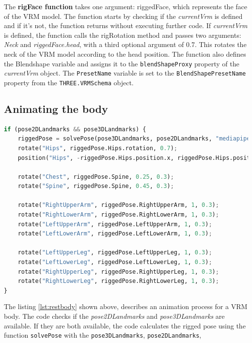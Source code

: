 The \textbf{rigFace function} takes one argument: riggedFace, which represents the face of the VRM model. The function starts 
by checking if the \emph{currentVrm} is defined and if it's not, the function returns without executing further code.
If \emph{currentVrm} is defined, the function calls the rigRotation method and passes two arguments: \emph{Neck} and \emph{riggedFace.head}, 
with a third optional argument of 0.7. This rotates the neck of the VRM model according to the head position.
The function also defines the Blendshape variable and assigns it to the \texttt{blendShapeProxy} property of the \emph{currentVrm} object. 
The \texttt{PresetName} variable is set to the \texttt{BlendShapePresetName} property from the \texttt{THREE.VRMSchema} object.

\subsection{Animating the body}
\begin{lstlisting}[language=Python,caption=Animating the rest of the body,label=lst:restbody]
    if (pose2DLandmarks && pose3DLandmarks) {
    riggedPose = solvePose(pose3DLandmarks, pose2DLandmarks, "mediapipe", videoElement);
    rotate("Hips", riggedPose.Hips.rotation, 0.7);
    position("Hips", -riggedPose.Hips.position.x, riggedPose.Hips.position.y + 1, -riggedPose.Hips.position.z, 1, 0.07);

    rotate("Chest", riggedPose.Spine, 0.25, 0.3);
    rotate("Spine", riggedPose.Spine, 0.45, 0.3);

    rotate("RightUpperArm", riggedPose.RightUpperArm, 1, 0.3);
    rotate("RightLowerArm", riggedPose.RightLowerArm, 1, 0.3);
    rotate("LeftUpperArm", riggedPose.LeftUpperArm, 1, 0.3);
    rotate("LeftLowerArm", riggedPose.LeftLowerArm, 1, 0.3);

    rotate("LeftUpperLeg", riggedPose.LeftUpperLeg, 1, 0.3);
    rotate("LeftLowerLeg", riggedPose.LeftLowerLeg, 1, 0.3);
    rotate("RightUpperLeg", riggedPose.RightUpperLeg, 1, 0.3);
    rotate("RightLowerLeg", riggedPose.RightLowerLeg, 1, 0.3);
}

\end{lstlisting}
The listing \ref{lst:restbody} shown above, describes an animation process for a VRM body. 
The code checks if the \emph{pose2DLandmarks} and \emph{pose3DLandmarks} are available. If they are both available, 
the code calculates the rigged pose using the function \texttt{solvePose} with the \texttt{pose3DLandmarks}, \texttt{pose2DLandmarks}, 
